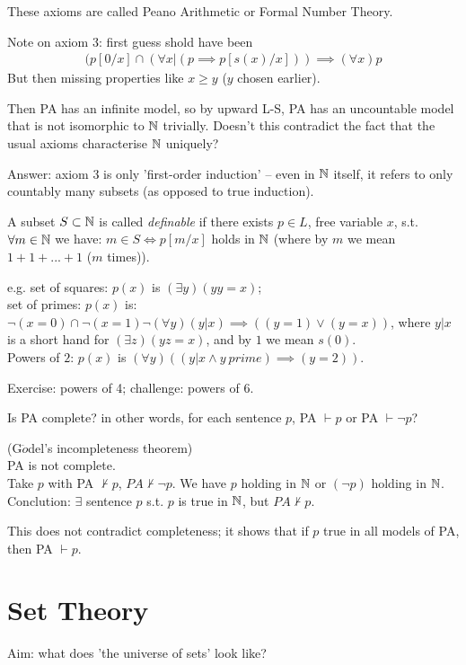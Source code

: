 \documentclass[a4paper]{article}
\begin{document}
These axioms are called Peano Arithmetic or Formal Number Theory.

Note on axiom 3: first guess shold have been 
\begin{equation*}
\begin{aligned}
(p[0/x] \cap (\forall x|(p \implies p[s(x)/x])) \implies (\forall x) p
\end{aligned}
\end{equation*}
But then missing properties like $x \geq y$ ($y$ chosen earlier).

Then PA has an infinite model, so by upward L-S, PA has an uncountable model that is not isomorphic to $\mathbb{N}$ trivially. Doesn't this contradict the fact that the usual axioms characterise $\mathbb{N}$ uniquely?

Answer: axiom 3 is only 'first-order induction' -- even in $\mathbb{N}$ itself, it refers to only countably many subsets (as opposed to true induction).

A subset $S \subset \mathbb{N}$ is called \emph{definable} if there exists $p \in L$, free variable $x$, s.t. $\forall m \in \mathbb{N}$ we have: $m \in S \iff p[m/x]$ holds in $\mathbb{N}$ (where by $m$ we mean $1+1+...+1$ ($m$ times)).

e.g. set of squares: $p(x)$ is $(\exists y) (yy=x)$;\\
set of primes: $p(x)$ is: $\neg(x=0) \cap \neg(x=1) \neg (\forall y) (y |x) \implies ((y=1) \vee (y=x))$, where $y|x$ is a short hand for $(\exists z) (yz = x)$, and by $1$ we mean $s(0)$.\\
Powers of $2$: $p(x)$ is $(\forall y) ((y|x \wedge y\ prime) \implies (y=2))$.

Exercise: powers of 4; challenge: powers of 6.

Is PA complete? in other words, for each sentence $p$, PA $\vdash p$ or PA $\vdash \neg p$?

\begin{thm} (G$\ddot{o}$del's incompleteness theorem)\\
PA is not complete.\\
Take $p$ with PA $\not\vdash p$, $PA \not\vdash \neg p$. We have $p$ holding in $\mathbb{N}$ or $(\neg p)$ holding in $\mathbb{N}$. Conclution: $\exists$ sentence $p$ s.t. $p$ is true in $\mathbb{N}$, but $PA \not\vdash p$.
\end{thm}

This does not contradict completeness; it shows that if $p$ true in all models of PA, then PA $\vdash p$.

\newpage
\section{Set Theory}
Aim: what does 'the universe of sets' look like?
\end{document}
